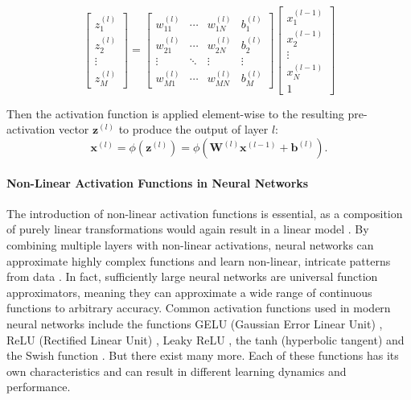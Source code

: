 \begin{equation}
	\begin{bmatrix}
		z_1^{(l)} \\
		z_2^{(l)} \\
		\vdots \\
		z_M^{(l)}
	\end{bmatrix}
	=
	\begin{bmatrix}
		w_{11}^{(l)} & \cdots & w_{1N}^{(l)} & b_1^{(l)} \\
		w_{21}^{(l)} & \cdots & w_{2N}^{(l)} & b_2^{(l)} \\
		\vdots & \ddots & \vdots & \vdots \\
		w_{M1}^{(l)} & \cdots & w_{MN}^{(l)} & b_M^{(l)}
		\end{bmatrix}
		\begin{bmatrix}
		x_1^{(l-1)} \\
		x_2^{(l-1)} \\
		\vdots \\
		x_N^{(l-1)} \\
		1
	\end{bmatrix}
\end{equation}


Then the activation function is applied element-wise to the resulting pre-activation vector $\mathbf{z}^{(l)}$ to produce the output of layer $l$:
\begin{equation}
	\mathbf{x}^{(l)} = \phi(\mathbf{z}^{(l)}) = \phi\!\left(\mathbf{W}^{(l)} \mathbf{x}^{(l-1)} + \mathbf{b}^{(l)}\right).
\end{equation}



\paragraph{Non-Linear Activation Functions in Neural Networks}
The introduction of non-linear activation functions is essential, as a composition of purely linear transformations would again result in a linear model \cite{Goodfellow-et-al-2016}. By combining multiple layers with non-linear activations, neural networks can approximate highly complex functions and learn non-linear, intricate patterns from data \cite{Hornik1991ApproximationCO}. In fact, sufficiently large neural networks are universal function approximators, meaning they can approximate a wide range of continuous functions to arbitrary accuracy. 
Common activation functions used in modern neural networks include the functions GELU (Gaussian Error Linear Unit) \cite{Hendrycks2016GaussianEL}, ReLU (Rectified Linear Unit) \cite{Nair2010RectifiedLU}, Leaky ReLU \cite{Maas2013RectifierNI}, the tanh (hyperbolic tangent) \cite{Ryck2021OnTA} and the Swish function \cite{Ramachandran2017SwishAS}. But there exist many more. Each of these functions has its own characteristics and can result in different learning dynamics and performance. 

